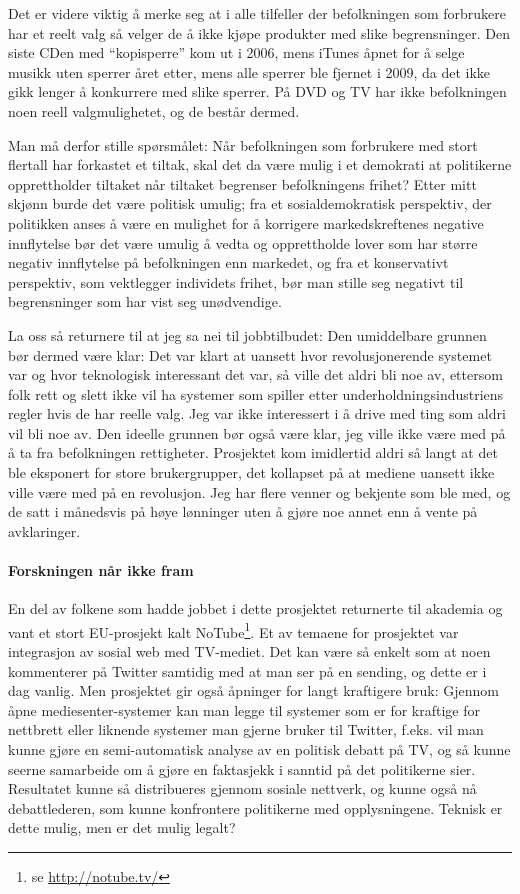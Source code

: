 \documentclass[11pt,norsk,a4paper]{article}
\begin{document}
Det er videre viktig å merke seg at i alle tilfeller der befolkningen
som forbrukere har et reelt valg så velger de å ikke kjøpe produkter
med slike begrensninger. Den siste CDen med ``kopisperre'' kom ut i
2006\cite{aftkopi}, mens iTunes åpnet for å selge musikk uten sperrer året etter,
mens alle sperrer ble fjernet i 2009\cite{ituneskopi}, da det ikke gikk lenger å
konkurrere med slike sperrer. På DVD og TV har
ikke befolkningen noen reell valgmulighetet, og de består dermed.

Man må derfor stille spørsmålet: Når befolkningen som forbrukere med
stort flertall har forkastet et tiltak, skal det da være mulig i et
demokrati at politikerne opprettholder tiltaket når tiltaket begrenser
befolkningens frihet? Etter mitt skjønn burde det være politisk
umulig; fra et sosialdemokratisk perspektiv, der politikken anses å
være en mulighet for å korrigere markedskreftenes negative innflytelse
bør det være umulig å vedta og opprettholde lover som har større
negativ innflytelse på befolkningen enn markedet, og fra et
konservativt perspektiv, som vektlegger individets frihet, bør man
stille seg negativt til begrensninger som har vist seg unødvendige.

La oss så returnere til at jeg sa nei til jobbtilbudet: Den
umiddelbare grunnen bør dermed være klar: Det var klart at uansett
hvor revolusjonerende systemet var og hvor teknologisk interessant det
var, så ville det aldri bli noe av, ettersom folk rett og slett ikke
vil ha systemer som spiller etter underholdningsindustriens regler
hvis de har reelle valg. Jeg var ikke interessert i å drive med ting
som aldri vil bli noe av. Den ideelle grunnen bør også være klar, jeg
ville ikke være med på å ta fra befolkningen rettigheter. Prosjektet
kom imidlertid aldri så langt at det ble eksponert for store
brukergrupper, det kollapset på at mediene uansett ikke ville være med
på en revolusjon. Jeg har flere venner og bekjente som ble med, og de
satt i månedsvis på høye lønninger uten å gjøre noe annet enn å vente
på avklaringer.

\paragraph{Forskningen når ikke fram}

En del av folkene som hadde jobbet i dette prosjektet returnerte til
akademia og vant et stort EU-prosjekt kalt
NoTube\footnote{se \url{http://notube.tv/}}. Et av temaene for
prosjektet var integrasjon av sosial web med TV-mediet. Det kan være
så enkelt som at noen kommenterer på Twitter samtidig med at man ser
på en sending, og dette er i dag vanlig. Men prosjektet gir også
åpninger for langt kraftigere bruk: Gjennom åpne mediesenter-systemer
kan man legge til systemer som er for kraftige for nettbrett eller
liknende systemer man gjerne bruker til Twitter, f.eks. vil man kunne
gjøre en semi-automatisk analyse av en politisk debatt på TV, og så
kunne seerne samarbeide om å gjøre en faktasjekk i sanntid på det
politikerne sier. Resultatet kunne så distribueres gjennom sosiale
nettverk, og kunne også nå debattlederen, som kunne konfrontere
politikerne med opplysningene. Teknisk er dette mulig, men er det
mulig legalt?
\end{document}
